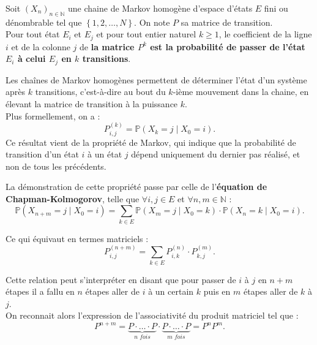 \documentclass{article}
\begin{document}
\begin{tcolorbox}[colback=white,colframe=red!80!black,title=Matrice de transition pour $k$-transitions]
Soit $(X_n)_{n \in \mathbb{N}}$ une chaine de Markov homogène d'espace d'états $E$ fini ou dénombrable tel que $\left\{1,2,\ldots,N\right\}$. On note $P$ sa matrice de transition. \\

Pour tout état $E_i$ et $E_j$ et pour tout entier naturel $k \geq 1$, le coefficient de la ligne $i$ et de la colonne $j$ de \textbf{la matrice $P^k$ est la probabilité de passer de l'état $E_i$ à celui $E_j$ en $k$ transitions}.
\end{tcolorbox}

Les chaînes de Markov homogènes permettent de déterminer l'état d'un système après $k$ transitions, c'est-à-dire au bout du $k$-ième mouvement dans la chaine, en élevant la matrice de transition à la puissance $k$. \\
Plus formellement, on a :
\[
P_{i,j}^{(k)} = \mathbb{P}(X_k = j \mid X_0 = i).
\]
Ce résultat vient de la propriété de Markov, qui indique que la probabilité de transition d'un état $i$ à un état $j$ dépend uniquement du dernier pas réalisé, et non de tous les précédents.

\begin{tcolorbox}[colback=white,colframe=green!80!black,title=Démonstration]
La démonstration de cette propriété passe par celle de l'\textbf{équation de Chapman-Kolmogorov}, telle que $\forall i,j \in E$ et $\forall n,m \in \mathbb{N}$ :
\[
\mathbb{P}(X_{n+m} = j \mid X_0 = i) = \sum_{k \in E} \mathbb{P}(X_{m} = j \mid X_0 = k) \cdot \mathbb{P}(X_n = k \mid X_0 = i).
\]

Ce qui équivaut en termes matriciels :
\[
P_{i,j}^{(n+m)} = \sum_{k \in E} P_{i,k}^{(n)} \cdot P_{k,j}^{(m)}.
\]

Cette relation peut s'interpréter en disant que pour passer de $i$ à $j$ en $n+m$ étapes il a fallu en $n$ étapes aller de $i$ à un certain $k$ puis en $m$ étapes aller de $k$ à $j$. \\

On reconnait alors l'expression de l'associativité du produit matriciel tel que :
\[
P^{n+m} = \underbrace{P \cdot \ldots \cdot P}_\textit{n fois} \cdot \underbrace{P \cdot \ldots \cdot P}_\textit{m fois} = P^{n}P^{m}.
\]
\end{tcolorbox}
\end{document}
